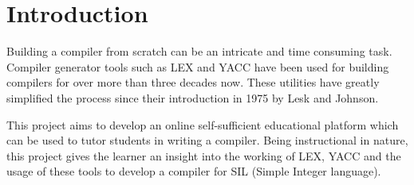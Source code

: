 \chapter{Introduction}

Building a compiler from scratch can be an intricate and time consuming task. Compiler  generator tools such as LEX and YACC have been used for building compilers for over more than three decades now. These utilities have greatly simplified the process since their introduction in 1975 by Lesk and Johnson.

This project aims to develop an online self-sufficient educational platform which can be used to tutor students in writing a compiler. Being instructional in nature, this project gives the learner an insight into the working of LEX, YACC and the usage of these tools to develop a compiler for SIL (Simple Integer language).              